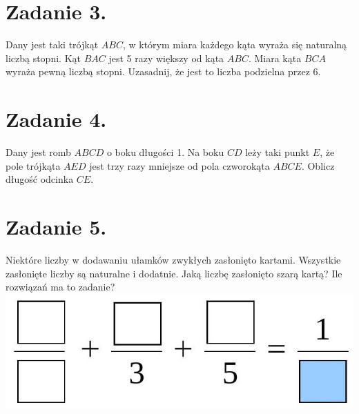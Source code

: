 \documentclass[10pt]{article}
\begin{document}
\section*{Zadanie 3.}
Dany jest taki trójkąt \(A B C\), w którym miara każdego kąta wyraża się naturalną liczbą stopni. Kąt \(B A C\) jest 5 razy większy od kąta \(A B C\). Miara kąta \(B C A\) wyraża pewną liczbą stopni. Uzasadnij, że jest to liczba podzielna przez 6.

\section*{Zadanie 4.}
Dany jest romb \(A B C D\) o boku długości 1. Na boku \(C D\) leży taki punkt \(E\), że pole trójkąta \(A E D\) jest trzy razy mniejsze od pola czworokąta \(A B C E\). Oblicz długość odcinka \(C E\).

\section*{Zadanie 5.}
Niektóre liczby w dodawaniu ułamków zwykłych zasłonięto kartami. Wszystkie zasłonięte liczby są naturalne i dodatnie. Jaką liczbę zasłonięto szarą kartą? Ile rozwiązań ma to zadanie?\\
\includegraphics[max width=\textwidth, center]{2024_11_21_3799db89e062e92fb27eg-1(1)}
\end{document}
